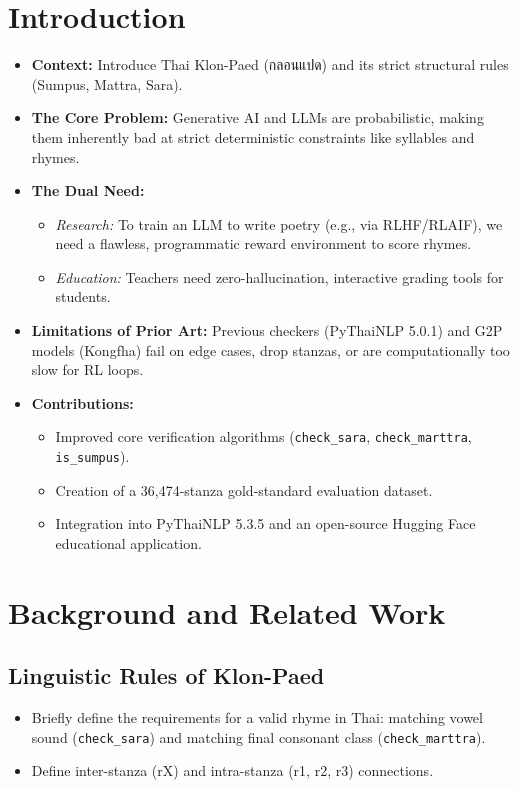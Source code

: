 \documentclass[conference]{IEEEtran}
\begin{document}
\section{Introduction}
\begin{itemize}
    \item \textbf{Context:} Introduce Thai Klon-Paed (กลอนแปด) and its strict structural rules (Sumpus, Mattra, Sara).
    \item \textbf{The Core Problem:} Generative AI and LLMs are probabilistic, making them inherently bad at strict deterministic constraints like syllables and rhymes.
    \item \textbf{The Dual Need:} 
        \begin{itemize}
            \item \textit{Research:} To train an LLM to write poetry (e.g., via RLHF/RLAIF), we need a flawless, programmatic reward environment to score rhymes.
            \item \textit{Education:} Teachers need zero-hallucination, interactive grading tools for students.
        \end{itemize}
    \item \textbf{Limitations of Prior Art:} Previous checkers (PyThaiNLP 5.0.1) and G2P models (Kongfha) fail on edge cases, drop stanzas, or are computationally too slow for RL loops.
    \item \textbf{Contributions:} 
        \begin{itemize}
            \item Improved core verification algorithms (\texttt{check\_sara}, \texttt{check\_marttra}, \texttt{is\_sumpus}).
            \item Creation of a 36,474-stanza gold-standard evaluation dataset.
            \item Integration into PyThaiNLP 5.3.5 and an open-source Hugging Face educational application.
        \end{itemize}
\end{itemize}

\section{Background and Related Work}
\subsection{Linguistic Rules of Klon-Paed}
\begin{itemize}
    \item Briefly define the requirements for a valid rhyme in Thai: matching vowel sound (\texttt{check\_sara}) and matching final consonant class (\texttt{check\_marttra}).
    \item Define inter-stanza (rX) and intra-stanza (r1, r2, r3) connections.
\end{itemize}
\end{document}
